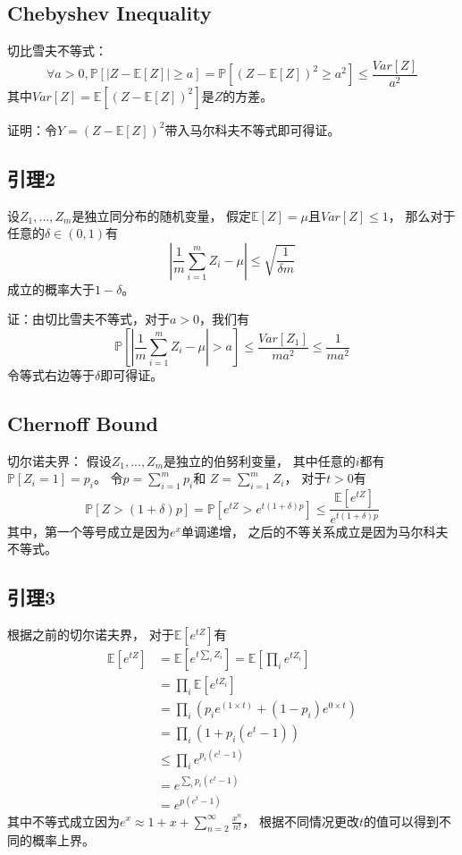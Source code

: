 \documentclass[UTF8]{ctexart}
\begin{document}
\subsection{Chebyshev Inequality}
切比雪夫不等式：
$$
\forall a>0,
\mathbb{P}[|Z-\mathbb{E}[Z]|\geq a] = 
\mathbb{P}[(Z-\mathbb{E}[Z])^2 \geq a^2] \leq
\frac{Var[Z]}{a^2}
$$
其中$Var[Z]=\mathbb{E}[(Z-\mathbb{E}[Z])^2]$是$Z$的方差。

证明：令$Y=(Z-\mathbb{E}[Z])^2$带入马尔科夫不等式即可得证。

\subsection{引理2}
设$Z_1,...,Z_m$是独立同分布的随机变量，
假定$\mathbb{E}[Z]=\mu$且$Var[Z]\leq 1$，
那么对于任意的$\delta\in(0,1)$有
$$
|\frac{1}{m}\sum^m_{i=1}Z_i-\mu|\leq \sqrt{\frac{1}{\delta m}}
$$
成立的概率大于$1-\delta$。

证：由切比雪夫不等式，对于$a>0$，我们有
$$
\mathbb{P}[|\frac{1}{m}\sum^m_{i=1}Z_i-\mu|>a]\leq 
\frac{Var[Z_1]}{ma^2}\leq \frac{1}{ma^2}
$$
令等式右边等于$\delta$即可得证。


\subsection{Chernoff Bound}
切尔诺夫界：
假设$Z_1,...,Z_m$是独立的伯努利变量，
其中任意的$i$都有
$\mathbb{P}[Z_i=1]=p_i$。
令$p=\sum^m_{i=1}p_i$和
$Z=\sum^m_{i=1}Z_i$，
对于$t>0$有
$$
\mathbb{P}[Z>(1+\delta)p]=
\mathbb{P}[e^{tZ}>e^{t(1+\delta)p}]\leq
\frac{\mathbb{E}[e^{tZ}]}{e^{t(1+\delta)p}}
$$
其中，第一个等号成立是因为$e^x$单调递增，
之后的不等关系成立是因为马尔科夫不等式。

\subsection{引理3}
根据之前的切尔诺夫界，
对于$\mathbb{E}[e^{tZ}]$有
$$
\begin{aligned}
\mathbb{E}[e^{tZ}] &= \mathbb{E}[e^{t\sum_iZ_i}]= \mathbb{E}[\prod_ie^{tZ_i}]\\
	&= \prod_i\mathbb{E}[e^{tZ_i}]\\
	&= \prod_i(p_ie^{(1\times t)}+(1-p_i)e^{0\times t})\\
	&= \prod_i(1+p_i(e^t-1))\\
	&\leq \prod_ie^{p_i(e^t-1)}\\
	&= e^{\sum_ip_i(e^t-1)}\\
	&= e^{p(e^t-1)}
\end{aligned}
$$
其中不等式成立因为$e^x\approx 1+x+\sum^\infty_{n=2}\frac{x^n}{n!}$，
根据不同情况更改$t$的值可以得到不同的概率上界。
\end{document}
